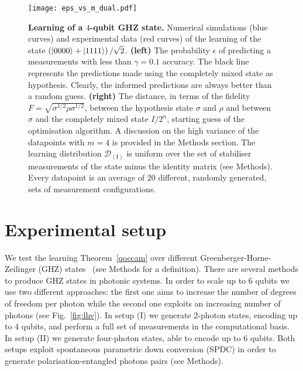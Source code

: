 \documentclass[aps,superscriptaddress,nofootinbib,twocolumn]{revtex4-1}
\begin{document}
\begin{figure*}[t]
\centering
\texttt{[image: eps\_vs\_m\_dual.pdf]}
\caption{\textbf{Learning of a $4$-qubit GHZ state.} Numerical simulations (blue curves) and experimental data (red curves) of the  learning of the state $\left(\ket{0000}+\ket{1111}\right)/\sqrt{2}$. \textbf{(left)} The probability $\epsilon$ of predicting a measurements with less than $\gamma=0.1$ accuracy. The black line represents the predictions made using the completely mixed state as hypothesis. Clearly, the informed predictions are always better than a random guess. \textbf{(right)} The distance, in terms of the fidelity $F = \sqrt{\sigma^{1/2}\rho \sigma^{1/2}}$, between the hypothesis state $\sigma$ and $\rho$ and between $\sigma$ and the completely mixed state $I/2^n$, starting guess of the optimisation algorithm. A discussion on the high variance of the datapoints with $m=4$ is provided in the Methods section. The learning distribution $\mathcal{D}_{(\mathrm{I})}$ is uniform over the set of stabiliser measurements of the state minus the identity matrix (see Methods). Every datapoint is an average of $20$ different, randomly generated, sets of measurement configurations.}
\label{fig:eps_vs_m_dual}
\end{figure*}

\section*{Experimental setup}\label{sec:expset}

We test the learning Theorem~\ref{qoccam} over different Greenberger-Horne-Zeilinger (GHZ) states~\cite{greenberger1989going} (see Methods for a definition). There are several methods to produce GHZ states \cite{walther2006experimental,
huang2011experimental, leibfried2004toward, brattke2001generation, carvacho2015twin, pan_ghz, ciampini_hypentanglement, barreiro, barbi} in photonic
systems. In order to scale up to $6$ qubits we use two different approaches: the first one aims to increase the number of degrees of freedom per photon while the second one exploits an increasing number of photons (see Fig.~\ref{fig:lhv}). 
In setup (I) we generate 2-photon states, encoding up to $4$ qubits, and perform a full set of measurements in the computational basis. In setup (II) we generate four-photon states, able to encode up to $6$ qubits.
Both setups exploit spontaneous parametric down conversion (SPDC) in order to
generate polarisation-entangled photons pairs (see Methods).\\
\end{document}
